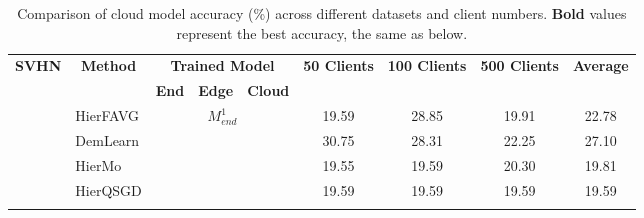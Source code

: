 \documentclass[10pt,journal]{IEEEtran}
\begin{document}
\begin{table}[]
\centering
\caption{Comparison of cloud model accuracy (\%) across different datasets and client numbers. \textbf{Bold} values represent the best accuracy, the same as below.}
\label{main-exp}
\setlength{\tabcolsep}{8pt}
\renewcommand{\arraystretch}{0.9}
\begin{tabular}{c|l|ccc|ccc|c}
\hline \hline
\multirow{8}{*}{\textbf{SVHN}}     & \multicolumn{1}{c|}{\multirow{2}{*}{\textbf{Method}}} & \multicolumn{3}{c|}{\textbf{Trained Model}}                               & \multirow{2}{*}{\textbf{50 Clients}} & \multirow{2}{*}{\textbf{100 Clients}} & \multirow{2}{*}{\textbf{500 Clients}} & \multirow{2}{*}{\textbf{Average}} \\
                                   & \multicolumn{1}{c|}{}                                 & \textbf{End}           & \textbf{Edge}          & \textbf{Cloud}          &                                      &                                       &                                       &                                   \\ \cline{2-9} 
                                   & HierFAVG                                              & \multicolumn{3}{c|}{\multirow{4}{*}{$M_{end}^1$}}                               & 19.59                                & 28.85                                 & 19.91                                 & 22.78                             \\
                                   & DemLearn                                              & \multicolumn{3}{c|}{}                                                     & 30.75                                & 28.31                                 & 22.25                                 & 27.10                             \\
                                   & HierMo                                                & \multicolumn{3}{c|}{}                                                     & 19.55                                & 19.59                                 & 20.30                                 & 19.81                             \\
                                   & HierQSGD                                              & \multicolumn{3}{c|}{}                                                     & 19.59                                & 19.59                                 & 19.59                                 & 19.59                             \\ \cline{2-9} 

\end{tabular}
\end{table}
\end{document}

